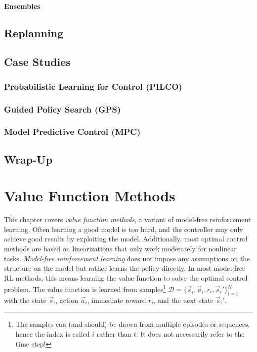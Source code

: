 			\subsubsection{Ensembles} %

	\section{Replanning} %

	\section{Case Studies} %

		\subsection{Probabilistic Learning for Control (PILCO)} %

		\subsection{Guided Policy Search (GPS)} %

		\subsection{Model Predictive Control (MPC)} %

	\section{Wrap-Up} %

\chapter{Value Function Methods}
	This chapter covers \emph{value function methods}, a variant of model-free reinforcement learning. Often learning a good model is too hard, and the controller may only achieve good results by exploiting the model. Additionally, most optimal control methods are based on linearizations that only work moderately for nonlinear tasks. \emph{Model-free reinforcement learning} does not impose any assumptions on the structure on the model but rather learns the policy directly. In most model-free RL methods, this means learning the value function to solve the optimal control problem. The value function is learned from samples\footnote{The samples can (and should) be drawn from multiple episodes or sequences, hence the index is called \(i\) rather than \(t\). It does not necessarily refer to the time step!} \( \mathcal{D} = \big\{ \vec{s}_i, \vec{a}_i, r_i, \vec{s}_i' \}_{i = 1}^{N} \) with the state \(\vec{s}_i\), action \(\vec{a}_i\), immediate reward \(r_i\), and the next state \(\vec{s}_i'\).

